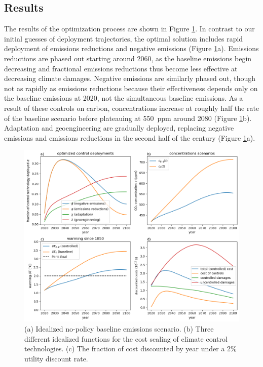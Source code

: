 \documentclass{article}
\begin{document}
\subsection{Results}
The results of the optimization process are shown in Figure \ref{fig-optimized}. In contrast to our initial guesses of deployment trajectories, the optimal solution includes rapid deployment of emissions reductions and negative emissions (Figure \ref{fig-optimized}a). Emissions reductions are phased out starting around 2060, as the baseline emissions begin decreasing and fractional emissions reductions thus become less effective at decreasing climate damages. Negative emissions are similarly phased out, though not as rapidly as emissions reductions because their effectiveness depends only on the baseline emissions at 2020, not the simultaneous baseline emissions. As a result of these controls on carbon, concentrations increase at roughly half the rate of the baseline scenario before plateauing at \SI{550}{ppm} around 2080 (Figure \ref{fig-optimized}b). Adaptation and geoengineering are gradually deployed, replacing negative emissions and emissions reductions in the second half of the century (Figure \ref{fig-optimized}a).

\begin{figure}[htb!]
\noindent\includegraphics[width=1.0\textwidth]{figures/model_trajectories_optimized.png}
\centering
\caption{(a) Idealized no-policy baseline emissions scenario. (b) Three different idealized functions for the cost scaling of climate control technologies. (c) The fraction of cost discounted by year under a 2\% utility discount rate.}
\label{fig-optimized}
\end{figure}
\end{document}
